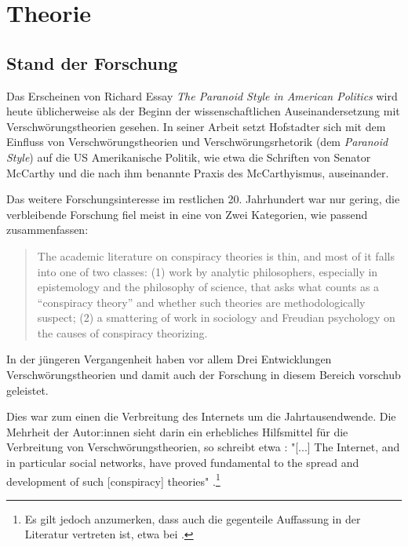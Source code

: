\section{Theorie}


\subsection{Stand der Forschung}

Das Erscheinen von Richard \textcite{hofstadter_2008} Essay \textit{The Paranoid Style in American Politics} wird heute üblicherweise als der Beginn der wissenschaftlichen Auseinandersetzung mit Verschwörungstheorien gesehen.
In seiner Arbeit setzt Hofstadter sich mit dem Einfluss von Verschwörungstheorien und Verschwörungsrhetorik (dem \textit{Paranoid Style}) auf die US Amerikanische Politik, wie etwa die Schriften von Senator McCarthy und die nach ihm benannte Praxis des McCarthyismus, auseinander.

Das weitere Forschungsinteresse im restlichen 20. Jahrhundert war nur gering, die verbleibende Forschung fiel meist in eine von Zwei Kategorien, wie \textcite{sunstein_2008} passend zusammenfassen:

\begin{quotation}
    The academic literature on conspiracy theories is thin, and most of it falls into one 
    of two classes: (1) work by analytic philosophers, especially in epistemology and the 
    philosophy of science, that asks what counts as a “conspiracy theory” and whether such theories are methodologically suspect; (2) a smattering of work in sociology and Freudian psychology on the causes of conspiracy theorizing. \parencite[][2]{sunstein_2008}
\end{quotation}

In der jüngeren Vergangenheit haben vor allem Drei Entwicklungen Verschwörungstheorien und damit auch der Forschung in diesem Bereich vorschub geleistet.

Dies war zum einen die Verbreitung des Internets um die Jahrtausendwende.
Die Mehrheit der Autor:innen sieht darin ein erhebliches Hilfsmittel für die Verbreitung von Verschwörungstheorien, so schreibt etwa \textcite{stano_2020}: "[...] The Internet, and in particular social networks, have proved fundamental to the spread and development of such [conspiracy] theories" \parencite[][492]{stano_2020}.\footnote{Es gilt jedoch anzumerken, dass auch die gegenteile Auffassung in der Literatur vertreten ist, etwa bei \textcite{clarke_2007}.}

